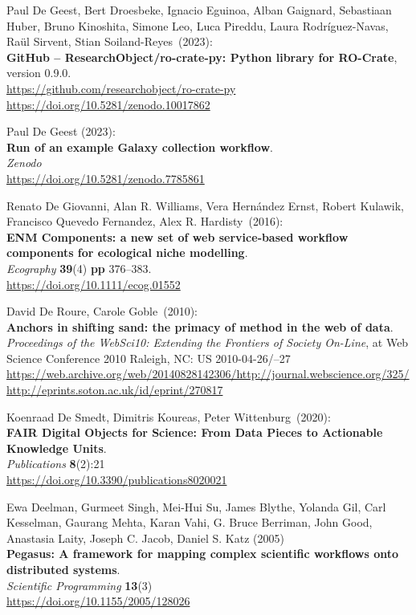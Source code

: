 \begin{thebibliography}{9}
Paul De Geest, Bert Droesbeke, Ignacio Eguinoa, Alban Gaignard, Sebastiaan Huber, Bruno Kinoshita, Simone Leo, Luca Pireddu, Laura Rodríguez-Navas, Raül Sirvent, Stian Soiland-Reyes~(2023):\\
\textbf{GitHub -- ResearchObject/ro-crate-py: Python library for
RO-Crate}, version 0.9.0.\\
\url{https://github.com/researchobject/ro-crate-py}\\
\url{https://doi.org/10.5281/zenodo.10017862}

Paul De Geest (2023):\\
\textbf{Run of an example Galaxy collection workflow}.\\
\emph{Zenodo}\\
\url{https://doi.org/10.5281/zenodo.7785861}

Renato De Giovanni, Alan R. Williams, Vera Hernández Ernst,
Robert Kulawik, Francisco Quevedo Fernandez, Alex R. Hardisty~(2016):\\
\textbf{ENM Components: a new set of web service‐based workflow
components for ecological niche modelling}.\\
\emph{Ecography}
\textbf{39}(4) \textbf{pp} 376--383.\\
\url{https://doi.org/10.1111/ecog.01552}

David De Roure, Carole Goble~(2010):\\
\textbf{Anchors in shifting sand: the primacy of method in the web of data}. \\
\emph{Proceedings of the WebSci10: Extending the Frontiers of Society On-Line},
at Web Science Conference 2010 Raleigh, NC: US 2010-04-26/--27\\
\url{https://web.archive.org/web/20140828142306/http://journal.webscience.org/325/}\\
\url{http://eprints.soton.ac.uk/id/eprint/270817} 

Koenraad De Smedt, Dimitris Koureas, Peter
Wittenburg~(2020):\\
\textbf{FAIR Digital Objects for Science: From Data Pieces to Actionable
Knowledge Units}.\\
\emph{Publications} \textbf{8}(2):21\\
\url{https://doi.org/10.3390/publications8020021}

Ewa Deelman, Gurmeet Singh, Mei-Hui Su, James Blythe, Yolanda Gil, Carl Kesselman, Gaurang Mehta, Karan Vahi, G. Bruce Berriman, John Good, Anastasia Laity, Joseph C. Jacob, Daniel S. Katz (2005)\\
\textbf{Pegasus: A framework for mapping complex scientific workflows onto distributed systems}.\\
\emph{Scientific Programming} \textbf{13}(3) \\
\url{https://doi.org/10.1155/2005/128026}


\end{thebibliography}
